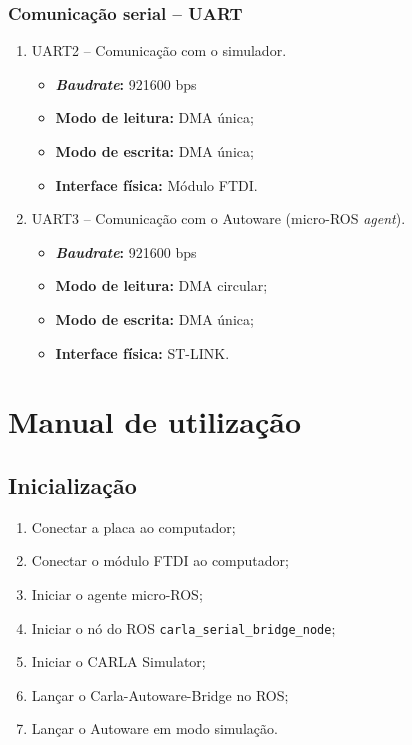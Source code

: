 \subsubsection*{Comunicação serial -- UART}

	\begin{enumerate}
		\item UART2 -- Comunicação com o simulador.
		\begin{itemize}
			\item \textbf{\textit{Baudrate}:} 921600 bps
			\item \textbf{Modo de leitura:} DMA única;
			\item \textbf{Modo de escrita:} DMA única;
			\item \textbf{Interface física:} Módulo FTDI.	
		\end{itemize}
	
		\item UART3 -- Comunicação com o Autoware (micro-ROS \textit{agent}).
		\begin{itemize}
			\item \textbf{\textit{Baudrate}:} 921600 bps
			\item \textbf{Modo de leitura:} DMA circular;
			\item \textbf{Modo de escrita:} DMA única;
			\item \textbf{Interface física:} ST-LINK.		
		\end{itemize}	
	
	\end{enumerate}

\clearpage

\section{Manual de utilização}

\subsection{Inicialização}

\begin{enumerate}
	\item Conectar a placa ao computador;
	\item Conectar o módulo FTDI ao computador;
	\item Iniciar o agente micro-ROS;
	\item Iniciar o nó do ROS \texttt{carla\_serial\_bridge\_node};
	\item Iniciar o CARLA Simulator;
	\item Lançar o Carla-Autoware-Bridge no ROS;
	\item Lançar o Autoware em modo simulação.
\end{enumerate}

